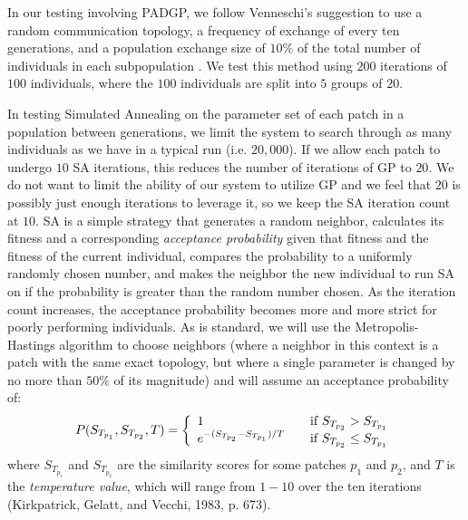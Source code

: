 \documentclass[12pt]{report} 	%
\numberwithin{figure}{chapter}
\numberwithin{table}{chapter}
\numberwithin{equation}{chapter}
\begin{document}
\begin{flushleft}
In our testing involving PADGP, we follow Venneschi's suggestion to use a random communication topology, a frequency of exchange of every ten generations, and a population exchange size of $10\%$ of the total number of individuals in each subpopulation \cite[p. 190]{Vanneschi:2004le}. We test this method using $200$ iterations of $100$ individuals, where the $100$ individuals are split into $5$ groups of $20$.

In testing Simulated Annealing on the parameter set of each patch in a population between generations, we limit the system to search through as many individuals as we have in a typical run (i.e. $20,000$). If we allow each patch to undergo $10$ SA iterations, this reduces the number of iterations of GP to $20$. We do not want to limit the ability of our system to utilize GP and we feel that $20$ is possibly just enough iterations to leverage it, so we keep the SA iteration count at $10$. SA is a simple strategy that generates a random neighbor, calculates its fitness and a corresponding \textit{acceptance probability} given that fitness and the fitness of the current individual, compares the probability to a uniformly randomly chosen number, and makes the neighbor the new individual to run SA on if the probability is greater than the random number chosen. As the iteration count increases, the acceptance probability becomes more and more strict for poorly performing individuals. As is standard, we will use the Metropolis-Hastings algorithm to choose neighbors (where a neighbor in this context is a patch with the same exact topology, but where a single parameter is changed by no more than $50\%$ of its magnitude) and will assume an acceptance probability of:
\begin{equation}
P(S_{T_{p_1}}, S_{T_{p_2}}, T) = \left\{
   \begin{array}{l l}
    1 & \quad \text{if $S_{T_{p_2}}>S_{T_{p_1}}$}\\
    e^{-(S_{T_{p_2}} - S_{T_{p_1}})/T} & \quad \text{if $S_{T_{p_2}}\leq S_{T_{p_1}}$}
    \end{array} \right.
\end{equation}
where $S_{T_{p_1}}$ and $S_{T_{p_2}}$ are the similarity scores for some patches $p_1$ and $p_2$, and $T$ is the \textit{temperature value}, which will range from $1-10$ over the ten iterations (Kirkpatrick, Gelatt, and Vecchi, 1983, p. 673).


\end{flushleft}
\end{document}
